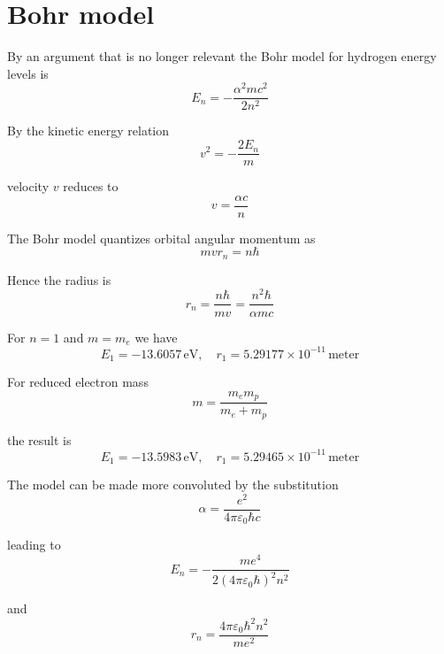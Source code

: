 


\section*{Bohr model}

By an argument that is no longer relevant the Bohr model
for hydrogen energy levels is
\begin{equation*}
E_n=-\frac{\alpha^2mc^2}{2n^2}
\end{equation*}

By the kinetic energy relation
\begin{equation*}
v^2=-\frac{2E_n}{m}
\end{equation*}

velocity $v$ reduces to
\begin{equation*}
v=\frac{\alpha c}{n}
\end{equation*}

The Bohr model quantizes orbital angular momentum as
\begin{equation*}
mvr_n=n\hbar
\end{equation*}

Hence the radius is
\begin{equation*}
r_n=\frac{n\hbar}{mv}=\frac{n^2\hbar}{\alpha mc}
\end{equation*}

For $n=1$ and $m=m_e$ we have
\begin{equation*}
E_1=-13.6057\,\text{eV},\quad
r_1=5.29177\times10^{-11}\,\text{meter}
\end{equation*}

For reduced electron mass
\begin{equation*}
m=\frac{m_em_p}{m_e+m_p}
\end{equation*}

the result is
\begin{equation*}
E_1=-13.5983\,\text{eV},\quad
r_1=5.29465\times10^{-11}\,\text{meter}
\end{equation*}

The model can be made more convoluted by the substitution
\begin{equation*}
\alpha=\frac{e^2}{4\pi\varepsilon_0\hbar c}
\end{equation*}

leading to
\begin{equation*}
E_n=-\frac{me^4}{2(4\pi\varepsilon_0\hbar)^2n^2}
\end{equation*}

and
\begin{equation*}
r_n=\frac{4\pi\varepsilon_0\hbar^2n^2}{me^2}
\end{equation*}


